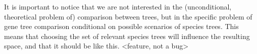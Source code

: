 It is important to notice that we are not interested in the (unconditional, theoretical problem of) comparison between
trees, but in the specific problem of gene tree comparison conditional on possible scenarios of species trees. This
means that choosing the set of relevant species trees will influence the resulting space, and that it should be like
this. <feature, not a bug>


